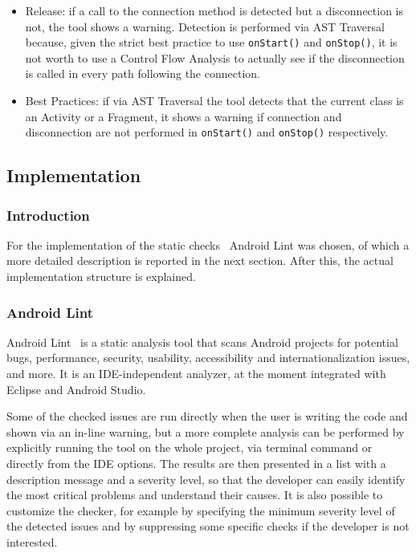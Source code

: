 \documentclass[11pt,a4paper,notitlepage]{article}
\begin{document}
\begin{itemize}
	\begin{itemize}
		\item Release: if a call to the connection method is detected but a disconnection is not, the tool shows a warning. Detection is performed via AST Traversal because, given the strict best practice to use \texttt{onStart()} and \texttt{onStop()}, it is not worth to use a Control Flow Analysis to actually see if the disconnection is called in every path following the connection.
		\item Best Practices: if via AST Traversal the tool detects that the current class is an Activity or a Fragment, it shows a warning if connection and disconnection are not performed in \texttt{onStart()} and \texttt{onStop()} respectively.
	\end{itemize}
\end{itemize}

\subsection{Implementation}

\subsubsection{Introduction}
For the implementation of the static checks~\cite{RepositoryStatic} Android Lint was chosen, of which a more detailed description is reported in the next section. After this, the actual implementation structure is explained.

\subsubsection{Android Lint}
Android Lint~\cite{Lint} is a static analysis tool that scans Android projects for potential bugs, performance, security, usability, accessibility and internationalization issues, and more. It is an IDE-independent analyzer, at the moment integrated with Eclipse and Android Studio.

Some of the checked issues are run directly when the user is writing the code and shown via an in-line warning, but a more complete analysis can be performed by explicitly running the tool on the whole project, via terminal command or directly from the IDE options. The results are then presented in a list with a description message and a severity level, so that the developer can easily identify the most critical problems and understand their causes. It is also possible to customize the checker, for example by specifying the minimum severity level of the detected issues and by suppressing some specific checks if the developer is not interested.
\end{document}
